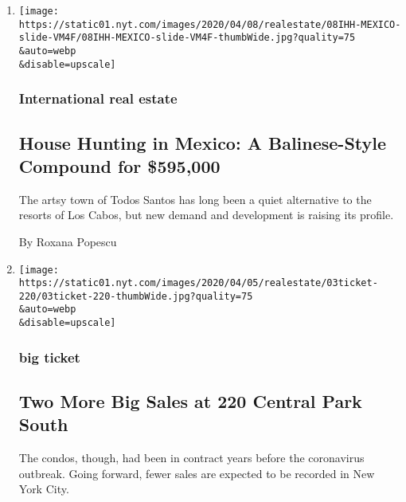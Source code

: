 \begin{enumerate}
\def\labelenumi{\arabic{enumi}.}
\item
  \href{/2020/04/08/realestate/house-hunting-in-mexico-a-balinese-style-compound-for-595000.html}{}

  \texttt{[image: https://static01.nyt.com/images/2020/04/08/realestate/08IHH-MEXICO-slide-VM4F/08IHH-MEXICO-slide-VM4F-thumbWide.jpg?quality=75\\\&auto=webp\\\&disable=upscale]}

  \hypertarget{international-real-estate-2}{%
  \subsubsection{International real
  estate}\label{international-real-estate-2}}

  \hypertarget{house-hunting-in-mexico-a-balinese-style-compound-for-595000-2}{%
  \subsection{House Hunting in Mexico: A Balinese-Style Compound for
  \$595,000}\label{house-hunting-in-mexico-a-balinese-style-compound-for-595000-2}}

  The artsy town of Todos Santos has long been a quiet alternative to
  the resorts of Los Cabos, but new demand and development is raising
  its profile.

  By Roxana Popescu
\item
  \href{/2020/04/03/realestate/two-more-big-sales-at-220-central-park-south.html}{}

  \texttt{[image: https://static01.nyt.com/images/2020/04/05/realestate/03ticket-220/03ticket-220-thumbWide.jpg?quality=75\\\&auto=webp\\\&disable=upscale]}

  \hypertarget{big-ticket-1}{%
  \subsubsection{big ticket}\label{big-ticket-1}}

  \hypertarget{two-more-big-sales-at-220-central-park-south-1}{%
  \subsection{Two More Big Sales at 220 Central Park
  South}\label{two-more-big-sales-at-220-central-park-south-1}}

  The condos, though, had been in contract years before the coronavirus
  outbreak. Going forward, fewer sales are expected to be recorded in
  New York City.


\end{enumerate}
